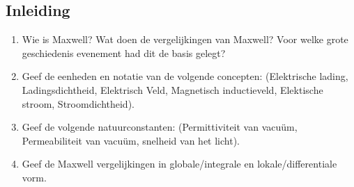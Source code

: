 \documentclass[12pt]{article}
\begin{document}
    \subsection{Inleiding}
    \begin{enumerate}
        \item Wie is Maxwell? Wat doen de vergelijkingen van Maxwell? Voor welke grote geschiedenis evenement had dit de basis gelegt?
        \item Geef de eenheden en notatie van de volgende concepten: (Elektrische lading, Ladingsdichtheid, Elektrisch Veld, Magnetisch inductieveld, Elektische stroom, Stroomdichtheid).
        \item Geef de volgende natuurconstanten: (Permittiviteit van vacuüm, Permeabiliteit van vacuüm, snelheid van het licht).
        \item Geef de Maxwell vergelijkingen in globale/integrale en lokale/differentiale vorm.
    \end{enumerate}
\end{document}
